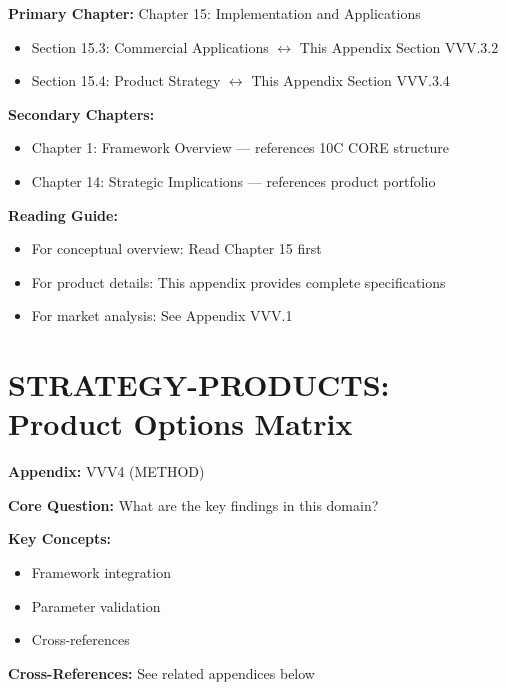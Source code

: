 \begin{tcolorbox}[colback=purple!5!white, colframe=purple!75!black,
    title=Chapter Linkage]

\textbf{Primary Chapter:} Chapter 15: Implementation and Applications
\begin{itemize}[nosep]
\item Section 15.3: Commercial Applications $\leftrightarrow$ This Appendix Section VVV.3.2
\item Section 15.4: Product Strategy $\leftrightarrow$ This Appendix Section VVV.3.4
\end{itemize}

\textbf{Secondary Chapters:}
\begin{itemize}[nosep]
\item Chapter 1: Framework Overview --- references 10C CORE structure
\item Chapter 14: Strategic Implications --- references product portfolio
\end{itemize}

\textbf{Reading Guide:}
\begin{itemize}[nosep]
\item For conceptual overview: Read Chapter 15 first
\item For product details: This appendix provides complete specifications
\item For market analysis: See Appendix VVV.1
\end{itemize}

\end{tcolorbox}


\chapter{STRATEGY-PRODUCTS: Product Options Matrix}
\label{app:vvv3-products}


\begin{tcolorbox}[colback=blue!5!white, colframe=blue!75!black,
    title=Quick Reference: Appendix VVV4]

\textbf{Appendix:} VVV4 (METHOD)

\textbf{Core Question:} What are the key findings in this domain?

\textbf{Key Concepts:}
\begin{itemize}[nosep]
\item Framework integration
\item Parameter validation
\item Cross-references
\end{itemize}

\textbf{Cross-References:} See related appendices below
\end{tcolorbox}

